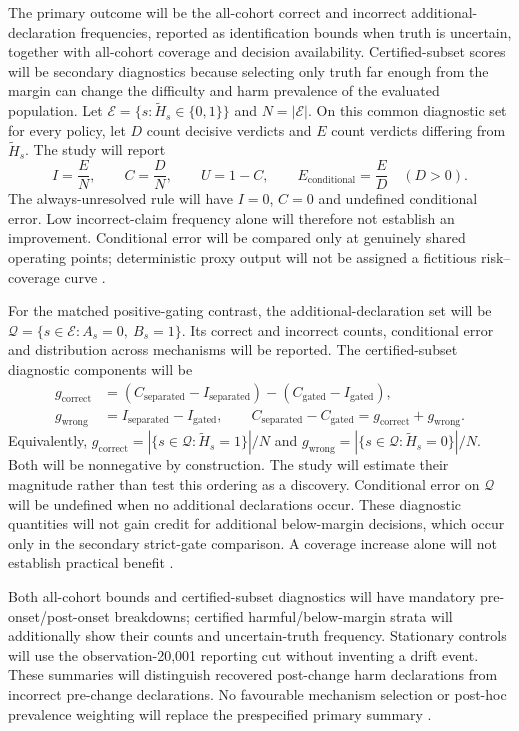 The primary outcome will be the all-cohort correct and incorrect additional-declaration frequencies, reported as identification bounds when truth is uncertain, together with all-cohort coverage and decision availability. Certified-subset scores will be secondary diagnostics because selecting only truth far enough from the margin can change the difficulty and harm prevalence of the evaluated population. Let $\mathcal E=\{s:\widetilde H_s\in\{0,1\}\}$ and $N=|\mathcal E|$. On this common diagnostic set for every policy, let $D$ count decisive verdicts and $E$ count verdicts differing from $\widetilde H_s$. The study will report
\begin{equation}
I=\frac{E}{N},\qquad C=\frac{D}{N},\qquad U=1-C,\qquad
E_{\mathrm{conditional}}=\frac{E}{D}\quad(D>0).
\end{equation}
The always-unresolved rule will have $I=0$, $C=0$ and undefined conditional error. Low incorrect-claim frequency alone will therefore not establish an improvement. Conditional error will be compared only at genuinely shared operating points; deterministic proxy output will not be assigned a fictitious risk--coverage curve \cite{selective}.

For the matched positive-gating contrast, the additional-declaration set will be $\mathcal Q=\{s\in\mathcal E:A_s=0,\ B_s=1\}$. Its correct and incorrect counts, conditional error and distribution across mechanisms will be reported. The certified-subset diagnostic components will be
\begin{align}
g_{\mathrm{correct}}&=(C_{\mathrm{separated}}-I_{\mathrm{separated}})
 -(C_{\mathrm{gated}}-I_{\mathrm{gated}}),\\
g_{\mathrm{wrong}}&=I_{\mathrm{separated}}-I_{\mathrm{gated}},\qquad
C_{\mathrm{separated}}-C_{\mathrm{gated}}=g_{\mathrm{correct}}+g_{\mathrm{wrong}}.
\end{align}
Equivalently, $g_{\mathrm{correct}}=|\{s\in\mathcal Q:\widetilde H_s=1\}|/N$ and $g_{\mathrm{wrong}}=|\{s\in\mathcal Q:\widetilde H_s=0\}|/N$. Both will be nonnegative by construction. The study will estimate their magnitude rather than test this ordering as a discovery. Conditional error on $\mathcal Q$ will be undefined when no additional declarations occur. These diagnostic quantities will not gain credit for additional below-margin decisions, which occur only in the secondary strict-gate comparison. A coverage increase alone will not establish practical benefit \cite{alencar,selective}.

Both all-cohort bounds and certified-subset diagnostics will have mandatory pre-onset/post-onset breakdowns; certified harmful/below-margin strata will additionally show their counts and uncertain-truth frequency. Stationary controls will use the observation-20,001 reporting cut without inventing a drift event. These summaries will distinguish recovered post-change harm declarations from incorrect pre-change declarations. No favourable mechanism selection or post-hoc prevalence weighting will replace the prespecified primary summary \cite{window,cerqueira}.

